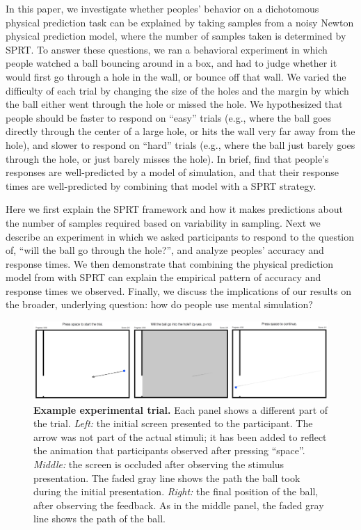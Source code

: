 \documentclass[10pt,letterpaper]{article}
\begin{document}
In this paper, we investigate whether peoples' behavior on a dichotomous physical prediction task can be explained by taking samples from a noisy Newton physical prediction model, where the number of samples taken is determined by SPRT. To answer these questions, we ran a behavioral experiment in which people watched a ball bouncing around in a box, and had to judge whether it would first go through a hole in the wall, or bounce off that wall. We varied the difficulty of each trial by changing the size of the holes and the margin by which the ball either went through the hole or missed the hole. We hypothesized that people should be faster to respond on ``easy'' trials (e.g., where the ball goes directly through the center of a large hole, or hits the wall very far away from the hole), and slower to respond on ``hard'' trials (e.g., where the ball just barely goes through the hole, or just barely misses the hole). In brief, find that people's responses are well-predicted by a model of simulation, and that their response times are well-predicted by combining that model with a SPRT strategy.

Here we first explain the SPRT framework and how it makes predictions about the number of samples required based on variability in sampling. Next we describe an experiment in which we asked participants to respond to the question of, ``will the ball go through the hole?'', and analyze peoples' accuracy and response times. We then demonstrate that combining the physical prediction model from  with SPRT can explain the empirical pattern of accuracy and response times we observed. Finally, we discuss the implications of our results on the broader, underlying question: how do people use mental simulation?

\begin{figure}[t]
    \begin{center}
        \includegraphics[width=\textwidth]{figures/experiment.png}
        \caption{\textbf{Example experimental trial.} Each panel shows a different part of the trial. \emph{Left:} the initial screen presented to the participant. The arrow was not part of the actual stimuli; it has been added to reflect the animation that participants observed after pressing ``space''. \emph{Middle:}  the screen is occluded after observing the stimulus presentation. The faded gray line shows the path the ball took during the initial presentation. \emph{Right:} the final position of the ball, after observing the feedback. As in the middle panel, the faded gray line shows the path of the ball.}
        \label{fig:experiment}
    \end{center}
\end{figure}
\end{document}
